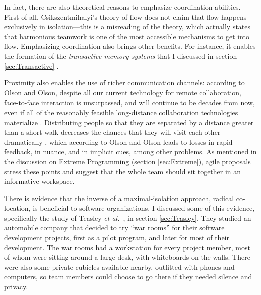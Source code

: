 In fact, there are also theoretical reasons to emphasize coordination abilities. First of all, Csikszentmihalyi's theory of flow does not claim that flow happens exclusively in isolation---this is a misreading of the theory, which actually states that harmonious teamwork is one of the most accessible mechanisms to get into flow. Emphasizing coordination also brings other benefits. For instance, it enables the formation of the \emph{transactive memory systems} that I discussed in section \ref{sec:Transactive} \cite{Wegner1991,Hollingshead2000}.

Proximity also enables the use of richer communication channels: according to Olson and Olson, despite all our current technology for remote collaboration, face-to-face interaction is unsurpassed, and will continue to be decades from now, even if all of the reasonably feasible long-distance collaboration technologies materialize \cite{Olson2000}. Distributing people so that they are separated by a distance greater than a short walk decreases the chances that they will visit each other dramatically \cite{Allen1977}, which according to Olson and Olson leads to losses in rapid feedback, in nuance, and in implicit cues, among other problems. As mentioned in the discussion on Extreme Programming (section \ref{sec:Extreme}), agile proposals stress these points and suggest that the whole team should sit together in an informative workspace.

There is evidence that the inverse of a maximal-isolation approach, radical co-location, is beneficial to software organizations. I discussed some of this evidence, specifically the study of Teasley \emph{et al.}\ , in section \ref{sec:Teasley}. They studied an automobile company that decided to try ``war rooms'' for their software development projects, first as a pilot program, and later for most of their development. The war rooms had a workstation for every project member, most of whom were sitting around a large desk, with whiteboards on the walls. There were also some private cubicles available nearby, outfitted with phones and computers, so team members could choose to go there if they needed silence and privacy.

